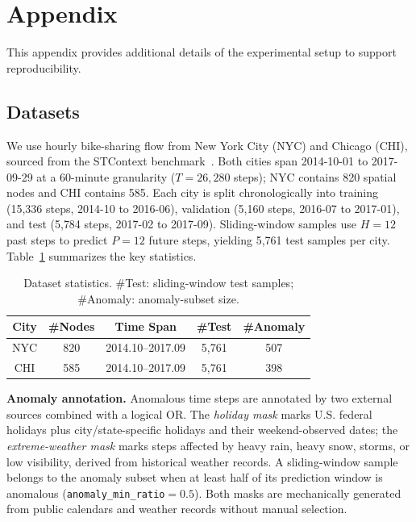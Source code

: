\clearpage
\setcounter{page}{1}
\renewcommand\thesection{\Alph{section}}
\setcounter{section}{0}
\setcounter{secnumdepth}{2}
\setcounter{footnote}{0}
\setcounter{table}{0}
\setcounter{figure}{0}
\section{Appendix}

This appendix provides additional details of the experimental setup to support reproducibility.

\subsection{Datasets}

We use hourly bike-sharing flow from New York City (NYC) and Chicago (CHI), sourced from the STContext benchmark~\cite{stcontext}. Both cities span 2014-10-01 to 2017-09-29 at a 60-minute granularity ($T=26{,}280$ steps); NYC contains 820 spatial nodes and CHI contains 585. Each city is split chronologically into training (15{,}336 steps, 2014-10 to 2016-06), validation (5{,}160 steps, 2016-07 to 2017-01), and test (5{,}784 steps, 2017-02 to 2017-09). Sliding-window samples use $H=12$ past steps to predict $P=12$ future steps, yielding 5{,}761 test samples per city. Table~\ref{tab:appendix_data} summarizes the key statistics.

\begin{table}[!htbp]
\centering
\setlength{\tabcolsep}{6pt}
\renewcommand\arraystretch{1.05}
\begin{tabular}{c|cccc}
\hline
City & \#Nodes & Time Span & \#Test & \#Anomaly \\ \hline
NYC & 820 & 2014.10--2017.09 & 5{,}761 & 507 \\
CHI & 585 & 2014.10--2017.09 & 5{,}761 & 398 \\
\hline
\end{tabular}
\caption{Dataset statistics. \#Test: sliding-window test samples; \#Anomaly: anomaly-subset size.}
\label{tab:appendix_data}
\end{table}

\noindent\textbf{Anomaly annotation.} Anomalous time steps are annotated by two external sources combined with a logical OR. The \emph{holiday mask} marks U.S. federal holidays plus city/state-specific holidays and their weekend-observed dates; the \emph{extreme-weather mask} marks steps affected by heavy rain, heavy snow, storms, or low visibility, derived from historical weather records. A sliding-window sample belongs to the anomaly subset when at least half of its prediction window is anomalous (\texttt{anomaly\_min\_ratio}$=0.5$). Both masks are mechanically generated from public calendars and weather records without manual selection.

